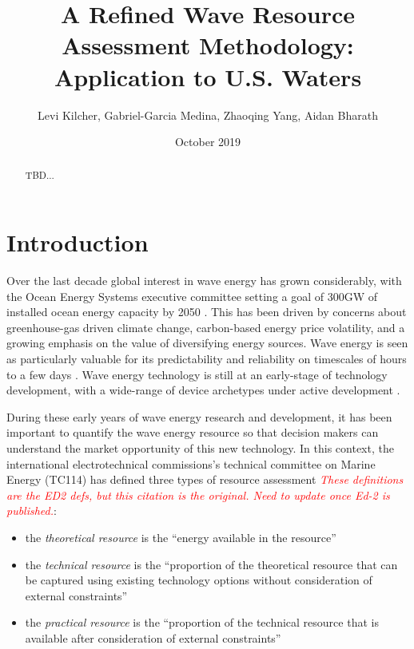 \documentclass[authoryear,preprint]{elsarticle}
\title{A Refined Wave Resource Assessment Methodology: Application to U.S. Waters}
\author{Levi Kilcher, Gabriel-Garcia Medina, Zhaoqing Yang, Aidan Bharath}
\date{October 2019}
\newcommand{\note}[1]{\textcolor{red}{\em #1}}
\begin{document}
\begin{abstract}
TBD...
\end{abstract}

\maketitle


\section{Introduction}

Over the last decade global interest in wave energy has grown considerably, with
the Ocean Energy Systems executive committee setting a goal of 300GW of
installed ocean energy capacity by 2050
\citep[]{huckerbyInternationalVisionOcean2017}. This has been driven by concerns
about greenhouse-gas driven climate change, carbon-based energy price
volatility, and a growing emphasis on the value of diversifying energy
sources. Wave energy is seen as particularly valuable for its predictability and
reliability on timescales of hours to a few days \citep{parkinsonIntegratingOceanWave2015}. Wave energy technology is still at an early-stage of technology
development, with a wide-range of device archetypes under active development
\citep[]{babaritOceanWaveEnergy2017}.

During these early years of wave energy research and development, it has been
important to quantify the wave energy resource so that decision makers can
understand the market opportunity of this new technology. In this context, the
international electrotechnical commissions's technical committee on Marine
Energy (TC114) has defined three types of resource assessment
\citep{internationalelectrotechnicalcommissionPartTerminology2011} \note{These
definitions are the ED2 defs, but this citation is the original. Need to update
once Ed-2 is published.}:

\begin{itemize}
  \item the { \it theoretical resource} is the ``energy available in the resource''
  \item the {\it technical resource} is the ``proportion of the theoretical resource that can be captured using existing technology options without consideration of external constraints''
  \item the {\it practical resource} is the ``proportion of the technical resource that is available after consideration of external constraints''
\end{itemize}
\end{document}
